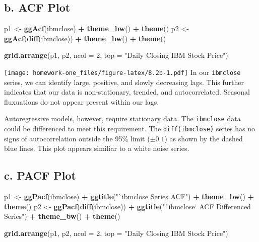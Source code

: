 \documentclass[openany]{book}
\newenvironment{Shaded}{\begin{snugshade}}{\end{snugshade}}
\newcommand{\DataTypeTok}[1]{\textcolor[rgb]{0.13,0.29,0.53}{#1}}
\newcommand{\DecValTok}[1]{\textcolor[rgb]{0.00,0.00,0.81}{#1}}
\newcommand{\KeywordTok}[1]{\textcolor[rgb]{0.13,0.29,0.53}{\textbf{#1}}}
\newcommand{\NormalTok}[1]{#1}
\newcommand{\OperatorTok}[1]{\textcolor[rgb]{0.81,0.36,0.00}{\textbf{#1}}}
\newcommand{\StringTok}[1]{\textcolor[rgb]{0.31,0.60,0.02}{#1}}
\begin{document}
\hypertarget{b.-acf-plot}{%
\subsection{b. ACF Plot}\label{b.-acf-plot}}

\begin{Shaded}
\begin{Highlighting}[]
\NormalTok{p1 <-}\StringTok{ }\KeywordTok{ggAcf}\NormalTok{(ibmclose) }\OperatorTok{+}\StringTok{ }\KeywordTok{theme_bw}\NormalTok{() }\OperatorTok{+}\StringTok{ }\KeywordTok{theme}\NormalTok{()}
\NormalTok{p2 <-}\StringTok{ }\KeywordTok{ggAcf}\NormalTok{(}\KeywordTok{diff}\NormalTok{(ibmclose)) }\OperatorTok{+}\StringTok{ }\KeywordTok{theme_bw}\NormalTok{() }\OperatorTok{+}\StringTok{ }\KeywordTok{theme}\NormalTok{()}

\KeywordTok{grid.arrange}\NormalTok{(p1, p2, }\DataTypeTok{ncol =} \DecValTok{2}\NormalTok{, }\DataTypeTok{top =} \StringTok{"Daily Closing IBM Stock Price"}\NormalTok{)}
\end{Highlighting}
\end{Shaded}

\texttt{[image: homework-one\_files/figure-latex/8.2b-1.pdf]}
In our \texttt{ibmclose} series, we can identify large, positive, and slowly decreasing lags. This further indicates that our data is non-stationary, trended, and autocorrelated. Seasonal fluxuations do not appear present within our lags.

Autoregressive models, however, require stationary data. The \texttt{ibmclose} data could be differenced to meet this requirement. The \texttt{diff(ibmclose)} series has no signs of autocorrelation outside the 95\% limit (\(\pm 0.1\)) as shown by the dashed blue lines. This plot appears similiar to a white noise series.

\hypertarget{c.-pacf-plot}{%
\subsection{c. PACF Plot}\label{c.-pacf-plot}}

\begin{Shaded}
\begin{Highlighting}[]
\NormalTok{p1 <-}\StringTok{ }\KeywordTok{ggPacf}\NormalTok{(ibmclose) }\OperatorTok{+}\StringTok{ }\KeywordTok{ggtitle}\NormalTok{(}\StringTok{"`ibmclose Series ACF"}\NormalTok{) }\OperatorTok{+}\StringTok{ }
\StringTok{  }\KeywordTok{theme_bw}\NormalTok{() }\OperatorTok{+}\StringTok{ }\KeywordTok{theme}\NormalTok{()}
\NormalTok{p2 <-}\StringTok{ }\KeywordTok{ggPacf}\NormalTok{(}\KeywordTok{diff}\NormalTok{(ibmclose)) }\OperatorTok{+}\StringTok{ }\KeywordTok{ggtitle}\NormalTok{(}\StringTok{"`ibmclose` ACF Differenced Series"}\NormalTok{) }\OperatorTok{+}\StringTok{ }
\StringTok{  }\KeywordTok{theme_bw}\NormalTok{() }\OperatorTok{+}\StringTok{ }\KeywordTok{theme}\NormalTok{()}

\KeywordTok{grid.arrange}\NormalTok{(p1, p2, }\DataTypeTok{ncol =} \DecValTok{2}\NormalTok{, }\DataTypeTok{top =} \StringTok{"Daily Closing IBM Stock Price"}\NormalTok{)}
\end{Highlighting}
\end{Shaded}
\end{document}
